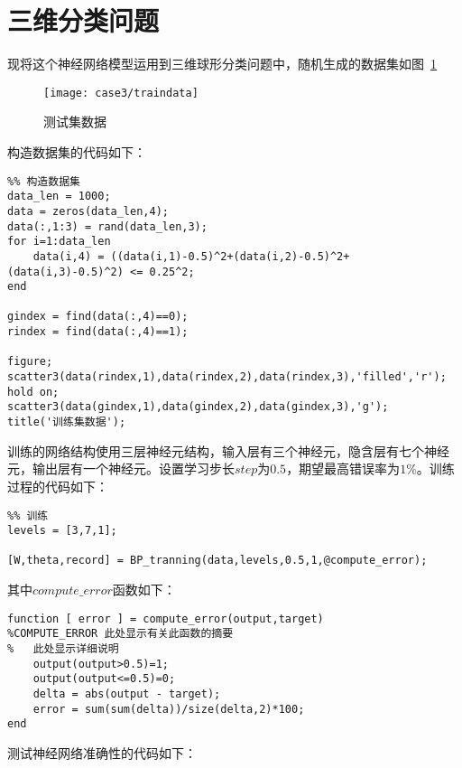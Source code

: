 \section{三维分类问题}

现将这个神经网络模型运用到三维球形分类问题中，随机生成的数据集如图~\ref{fig:case3:traindata}

\begin{figure}[h] 
 \centering
  \texttt{[image: case3/traindata]}
  \caption{测试集数据}
  \label{fig:case3:traindata}
\end{figure}

构造数据集的代码如下：

\begin{lstlisting}
%% 构造数据集
data_len = 1000;
data = zeros(data_len,4);
data(:,1:3) = rand(data_len,3);
for i=1:data_len
    data(i,4) = ((data(i,1)-0.5)^2+(data(i,2)-0.5)^2+(data(i,3)-0.5)^2) <= 0.25^2;
end

gindex = find(data(:,4)==0);
rindex = find(data(:,4)==1);

figure;
scatter3(data(rindex,1),data(rindex,2),data(rindex,3),'filled','r');
hold on;
scatter3(data(gindex,1),data(gindex,2),data(gindex,3),'g');
title('训练集数据');
\end{lstlisting}

训练的网络结构使用三层神经元结构，输入层有三个神经元，隐含层有七个神经元，输出层有一个神经元。设置学习步长$step$为$0.5$，期望最高错误率为$1$\%。训练过程的代码如下：

\begin{lstlisting}
%% 训练
levels = [3,7,1];

[W,theta,record] = BP_tranning(data,levels,0.5,1,@compute_error);
\end{lstlisting}

其中$compute\_error$函数如下：

\begin{lstlisting}
function [ error ] = compute_error(output,target)
%COMPUTE_ERROR 此处显示有关此函数的摘要
%   此处显示详细说明
    output(output>0.5)=1;
    output(output<=0.5)=0;
    delta = abs(output - target);
    error = sum(sum(delta))/size(delta,2)*100;
end
\end{lstlisting}

测试神经网络准确性的代码如下：

